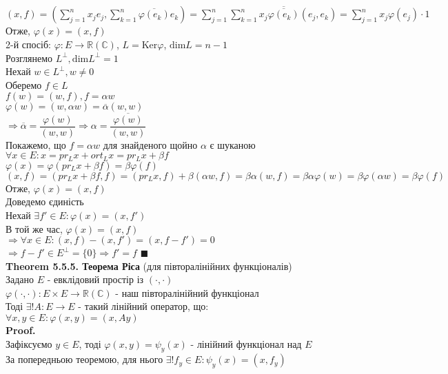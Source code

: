\documentclass[a4paper, 14pt]{extarticle}
\def\huge{\displaystyle}
\def\th#1{\textbf{Theorem {#1}}}
\def\proof{\textbf{Proof.}\\}
\def\bigline{\vspace{5mm}\\}
\def\qed{$\blacksquare$}
\def\dim#1{\textrm{dim} {#1}}
\def\ker#1{\textrm{Ker} {#1}}
\begin{document}
$(x,f) = \huge \left( \sum_{j=1}^n x_j e_j, \sum_{k=1}^n \overline{\varphi(e_k)}e_k \right) = \sum_{j=1}^n \sum_{k=1}^n x_j \overline{\overline{\varphi(e_k)}} (e_j,e_k) = \sum_{j=1}^n x_j \varphi(e_j) \cdot 1$\\
Отже, $\varphi(x) = (x,f)$
\bigline
2-й спосіб: $\varphi: E \to \mathbb{R} (\mathbb{C})$, $L = \ker \varphi$, $\dim L = n-1$\\
Розглянемо $L^{\perp}, \dim L^{\perp} = 1$\\
Нехай $w \in L^{\perp}, w \neq 0$\\
Оберемо $f \in L$\\
$f(w) = (w,f), f = \alpha w$\\
$\varphi(w) = (w, \alpha w) = \overline{\alpha} (w,w)$\\
$\Rightarrow \overline{\alpha} = \dfrac{\varphi(w)}{(w,w)} \Rightarrow \alpha = \dfrac{\overline{\varphi(w)}}{(w,w)}$\\
Покажемо, що $f = \alpha w$ для знайденого щойно $\alpha$ є шуканою\\
$\forall x \in E: x = pr_L x + ort_L x = pr_L x + \beta f$\\
$\varphi(x) = \varphi(pr_L x + \beta f) = \beta \varphi(f)$\\
$(x,f) = (pr_L x + \beta f, f) = (pr_L x, f) + \beta (\alpha w, f) = \beta \alpha (w,f) = \beta \alpha \varphi(w) = \beta \varphi(\alpha w) = \beta \varphi(f)$\\
Отже, $\varphi(x) = (x,f)$
\bigline
Доведемо єдиність\\
Нехай $\exists f' \in E: \varphi(x) = (x,f')$\\
В той же час, $\varphi(x) = (x,f)$\\
$\Rightarrow \forall x \in E: (x,f)-(x,f') = (x,f-f') = 0$\\
$\Rightarrow f-f' \in E^{\perp} = \{0\} \Rightarrow f' = f$ \qed
\bigline
\th{5.5.5. Теорема Ріса} (для півторалінійних функціоналів)\\
Задано $E$ - евклідовий простір із $(\cdot, \cdot)$\\
$\varphi(\cdot, \cdot): E \times E \to \mathbb{R} (\mathbb{C})$ - наш півторалінійний функціонал\\
Тоді $\exists! A: E \to E$ - такий лінійний оператор, що:\\
$\forall x,y \in E: \varphi(x,y) = (x, Ay)$\\
\proof
Зафіксуємо $y \in E$, тоді $\varphi(x,y) = \psi_y(x)$ - лінійний функціонал над $E$\\
За попередньою теоремою, для нього $\exists! f_y \in E: \psi_y(x) = (x,f_y)$\\
\end{document}

